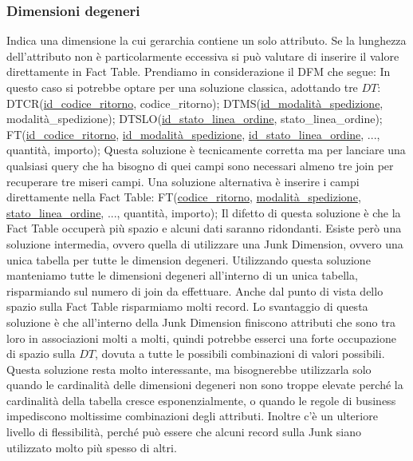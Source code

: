 \subsubsection{Dimensioni degeneri}
Indica una dimensione la cui gerarchia contiene un solo attributo. Se la lunghezza dell'attributo non è particolarmente eccessiva si può valutare di inserire il valore direttamente in Fact Table. Prendiamo in considerazione il DFM che segue:
\noindent In questo caso si potrebbe optare per una soluzione classica, adottando tre $DT$:\newline\newline
DTCR(\underline{id\_codice\_ritorno}, codice\_ritorno);\newline
DTMS(\underline{id\_modalità\_spedizione}, modalità\_spedizione);\newline
DTSLO(\underline{id\_stato\_linea\_ordine}, stato\_linea\_ordine);\newline
FT(\underline{id\_codice\_ritorno}, \underline{id\_modalità\_spedizione}, \underline{id\_stato\_linea\_ordine}, ..., quantità, importo);\newline\newline
Questa soluzione è tecnicamente corretta ma per lanciare una qualsiasi query che ha bisogno di quei campi sono necessari almeno tre join per recuperare tre miseri campi. Una soluzione alternativa è inserire i campi direttamente nella Fact Table:\newline\newline
FT(\underline{codice\_ritorno}, \underline{modalità\_spedizione}, \underline{stato\_linea\_ordine}, ..., quantità, importo);\newline
Il difetto di questa soluzione è che la Fact Table occuperà più spazio e alcuni dati saranno ridondanti.\newline
Esiste però una soluzione intermedia, ovvero quella di utilizzare una Junk Dimension, ovvero una unica tabella per tutte le dimension degeneri.
Utilizzando questa soluzione manteniamo tutte le dimensioni degeneri all'interno di un unica tabella, risparmiando sul numero di join da effettuare. Anche dal punto di vista dello spazio sulla Fact Table risparmiamo molti record. Lo svantaggio di questa soluzione è che all'interno della Junk Dimension finiscono attributi che sono tra loro in associazioni molti a molti, quindi potrebbe esserci una forte occupazione di spazio sulla $DT$, dovuta a tutte le possibili combinazioni di valori possibili. Questa soluzione resta molto interessante, ma bisognerebbe utilizzarla solo quando le cardinalità delle dimensioni degeneri non sono troppe elevate perché la cardinalità della tabella cresce esponenzialmente, o quando le regole di business impediscono moltissime combinazioni degli attributi. Inoltre c'è un ulteriore livello di flessibilità, perché può essere che alcuni record sulla Junk siano utilizzato molto più spesso di altri.
